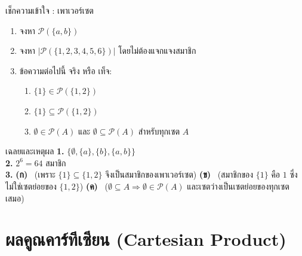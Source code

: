 \begin{frame}{เช็กความเข้าใจ : เพาเวอร์เซต}
  \begin{enumerate}
    \item จงหา $\mathcal{P}(\{a, b\})$
    \item จงหา $|\mathcal{P}(\{1, 2, 3, 4, 5, 6\})|$ โดยไม่ต้องแจกแจงสมาชิก
    \item ข้อความต่อไปนี้ จริง หรือ เท็จ:
          \begin{enumerate}
            \item[\textbf{(ก)}] $\{1\} \in \mathcal{P}(\{1, 2\})$
            \item[\textbf{(ข)}] $\{1\} \subseteq \mathcal{P}(\{1, 2\})$
            \item[\textbf{(ค)}] $\emptyset \in \mathcal{P}(A)$ และ $\emptyset \subseteq \mathcal{P}(A)$ สำหรับทุกเซต $A$
          \end{enumerate}
  \end{enumerate}
  \pause
  \begin{exampleblock}{เฉลยและเหตุผล}
    \footnotesize
    \textbf{1.} $\{\emptyset, \{a\}, \{b\}, \{a,b\}\}$ \\
    \textbf{2.} $2^6 = 64$ สมาชิก \\
    \textbf{3.}
    \textbf{(ก)} \TT\ (เพราะ $\{1\} \subseteq \{1,2\}$ จึงเป็นสมาชิกของเพาเวอร์เซต) \quad
    \textbf{(ข)} \FF\ (สมาชิกของ $\{1\}$ คือ $1$ ซึ่งไม่ใช่เซตย่อยของ $\{1,2\}$) \quad
    \textbf{(ค)} \TT\ ($\emptyset \subseteq A \Rightarrow \emptyset \in \mathcal{P}(A)$ และเซตว่างเป็นเซตย่อยของทุกเซตเสมอ)
  \end{exampleblock}
\end{frame}


\section{ผลคูณคาร์ทีเซียน (Cartesian Product)}

